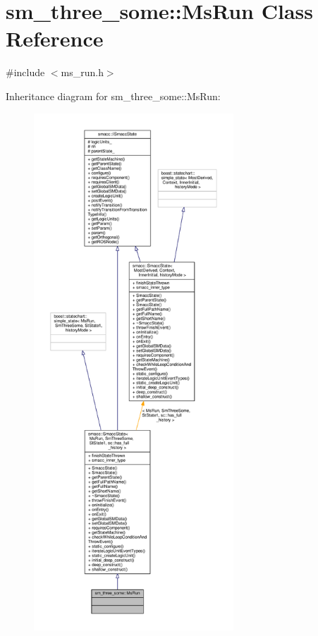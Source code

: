 \hypertarget{classsm__three__some_1_1MsRun}{}\section{sm\+\_\+three\+\_\+some\+:\+:Ms\+Run Class Reference}
\label{classsm__three__some_1_1MsRun}


{\ttfamily \#include $<$ms\+\_\+run.\+h$>$}



Inheritance diagram for sm\+\_\+three\+\_\+some\+:\+:Ms\+Run\+:\nopagebreak
\begin{figure}[H]
\begin{center}
\leavevmode
\includegraphics[height=550pt]{classsm__three__some_1_1MsRun__inherit__graph}
\end{center}
\end{figure}


